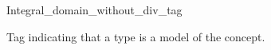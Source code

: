 \begin{ccRefClass}{Integral_domain_without_div_tag}
\label{Integral_domain_without_div_tag}

\ccDefinition
Tag indicating that a type is a model of the  concept. 

\ccIsModel
{}

\ccSeeAlso
{} \\
\end{ccRefClass} 

